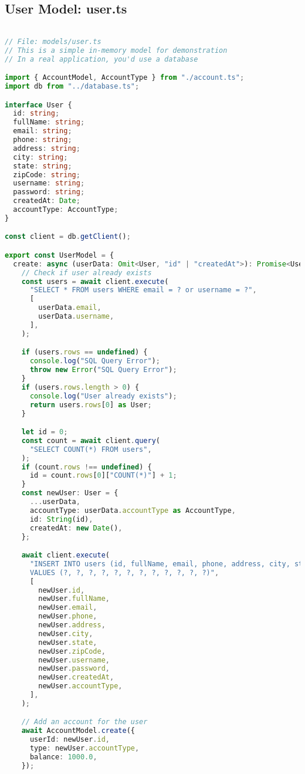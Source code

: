 \subsection{User Model: user.ts}
\begin{lstlisting}[language=TypeScript]

// File: models/user.ts
// This is a simple in-memory model for demonstration
// In a real application, you'd use a database

import { AccountModel, AccountType } from "./account.ts";
import db from "../database.ts";

interface User {
  id: string;
  fullName: string;
  email: string;
  phone: string;
  address: string;
  city: string;
  state: string;
  zipCode: string;
  username: string;
  password: string;
  createdAt: Date;
  accountType: AccountType;
}

const client = db.getClient();

export const UserModel = {
  create: async (userData: Omit<User, "id" | "createdAt">): Promise<User> => {
    // Check if user already exists
    const users = await client.execute(
      "SELECT * FROM users WHERE email = ? or username = ?",
      [
        userData.email,
        userData.username,
      ],
    );

    if (users.rows == undefined) {
      console.log("SQL Query Error");
      throw new Error("SQL Query Error");
    }
    if (users.rows.length > 0) {
      console.log("User already exists");
      return users.rows[0] as User;
    }

    let id = 0;
    const count = await client.query(
      "SELECT COUNT(*) FROM users",
    );
    if (count.rows !== undefined) {
      id = count.rows[0]["COUNT(*)"] + 1;
    }
    const newUser: User = {
      ...userData,
      accountType: userData.accountType as AccountType,
      id: String(id),
      createdAt: new Date(),
    };

    await client.execute(
      "INSERT INTO users (id, fullName, email, phone, address, city, state, zipCode, username, password, createdAt, accountType) \
      VALUES (?, ?, ?, ?, ?, ?, ?, ?, ?, ?, ?, ?)",
      [
        newUser.id,
        newUser.fullName,
        newUser.email,
        newUser.phone,
        newUser.address,
        newUser.city,
        newUser.state,
        newUser.zipCode,
        newUser.username,
        newUser.password,
        newUser.createdAt,
        newUser.accountType,
      ],
    );

    // Add an account for the user
    await AccountModel.create({
      userId: newUser.id,
      type: newUser.accountType,
      balance: 1000.0,
    });


\end{lstlisting}
